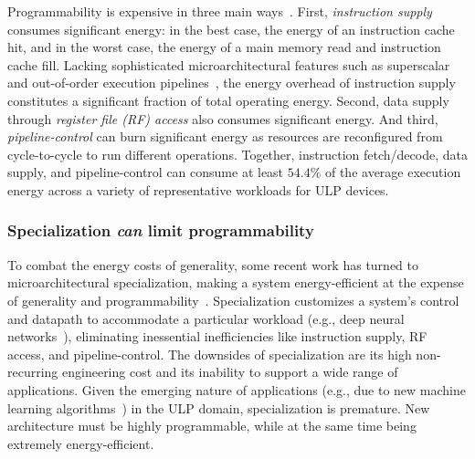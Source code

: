 Programmability is expensive in three main ways~\cite{horowitz:isscc14:energy-keynote,hameed2010understanding,balfour_elm_thesis}.
First, \emph{instruction supply} consumes significant energy: in the best case, the energy of
an instruction cache hit, and in the worst case, the energy of a main memory
read and instruction cache fill.  
%
Lacking sophisticated microarchitectural features such as superscalar and
out-of-order execution pipelines~\cite{msp430fr5994,traber2016pulpino}, the energy overhead of
instruction supply constitutes a significant fraction of total operating energy.
%
Second, data supply through \emph{register file (RF) access} also consumes significant energy.
% 
And third, \emph{pipeline-control} can burn significant energy as resources are reconfigured from cycle-to-cycle to run different operations.
%
Together, instruction fetch/decode, data supply, and pipeline-control can consume at least $54.4\%$ of the average execution energy across a variety of representative workloads for ULP devices.

\subsubsection{Specialization \emph{can} limit programmability}
To combat the energy costs of generality, some recent work has turned to
microarchitectural specialization, making a system energy-efficient at the
expense of generality and
programmability~\cite{chen:isca16:eyeriss,chen:asplos14:diannao,du:isca15:shidiannao,liu:isca15:pudiannao,chen2014dadiannao,venkatesh2010conservation}.
% 
Specialization customizes a system's control and datapath to accommodate a
particular workload (e.g., deep neural networks~\cite{chen:isca16:eyeriss,chen:asplos14:diannao}),
eliminating inessential inefficiencies like instruction supply, RF access, and pipeline-control.
% 
The downsides of specialization are its high non-recurring engineering cost and its inability to support a wide range of applications.
% 
Given the emerging nature of applications (e.g., due to
new machine learning algorithms~\cite{jouppi2021ten}) in the ULP domain, specialization is premature.
% 
New architecture must be highly programmable, while at the same time being  extremely energy-efficient. 


